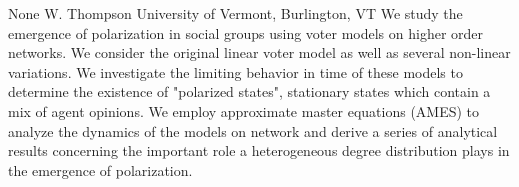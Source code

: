 
    \begin{abstract_online}{None}{%
        W. Thompson}{%
        }{%
        University of Vermont, Burlington, VT}
    We study the emergence of polarization in social groups using voter models on higher order networks. We consider the original linear voter model as well as several non-linear variations. We investigate the limiting behavior in time of these models to determine the existence of "polarized states", stationary states which contain a mix of agent opinions. We employ approximate master equations (AMES) to analyze the dynamics of the models on network and derive a series of analytical results concerning the important role a heterogeneous degree distribution plays in the emergence of polarization. 
    
    \end{abstract_online}
    